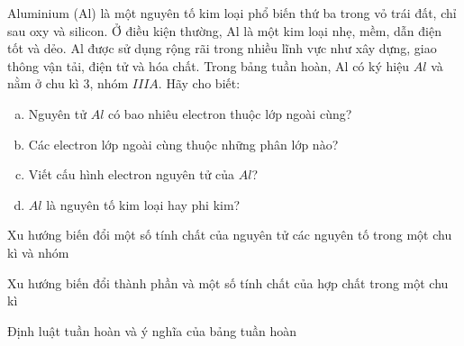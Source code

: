 \documentclass[Main_HOA10.tex]{subfiles}
\begin{document}
\begin{bt}
	Aluminium (Al) là một nguyên tố kim loại phổ biến thứ ba trong vỏ trái đất, chỉ sau oxy và silicon. Ở điều kiện thường, Al là một kim loại nhẹ, mềm, dẫn điện tốt và dẻo.  Al được sử dụng rộng rãi trong nhiều lĩnh vực như xây dựng, giao thông vận tải, điện tử và hóa chất.
	Trong bảng tuần hoàn, Al có ký hiệu $Al$ và nằm ở chu kì $3$, nhóm $IIIA$. Hãy cho biết:
	\begin{enumerate}[a)]
		\item Nguyên tử $Al$ có bao nhiêu electron thuộc lớp ngoài cùng?
		\item Các electron lớp ngoài cùng thuộc những phân lớp nào?
		\item Viết cấu hình electron nguyên tử của $Al$?
		\item $Al$ là nguyên tố kim loại hay phi kim?
	\end{enumerate}
\end{bt}
\begin{dang}{Xu hướng biến đổi một số tính chất của nguyên tử các nguyên tố trong một chu kì và nhóm}
\end{dang}
\begin{dang}{Xu hướng biến đổi thành phần và một số tính chất của hợp chất trong một chu kì}
\end{dang}

\begin{dang}{Định luật tuần hoàn và ý nghĩa của bảng tuần hoàn}
\end{dang}
\end{document}
